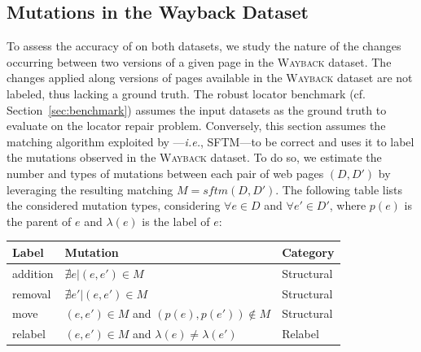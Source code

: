 \subsection{Mutations in the {\sc Wayback} Dataset}
To assess the accuracy of \erratum on both datasets, we study the nature of the changes occurring between two versions of a given page in the \textsc{Wayback} dataset.
The changes applied along versions of pages available in the \textsc{Wayback} dataset are not labeled, thus lacking a ground truth.
% 
The robust locator benchmark (cf. Section~\ref{sec:benchmark}) assumes the input datasets as the ground truth to evaluate \erratum on the locator repair problem.
Conversely, this section assumes the matching algorithm exploited by \erratum---\emph{i.e.}, SFTM---to be correct and uses it to label the mutations observed in the \textsc{Wayback} dataset.
% 
To do so, we estimate the number and types of mutations between each pair of web pages $(D, D')$ by leveraging the resulting matching $M = sftm(D,D')$.
The following table lists the considered mutation types, considering $\forall e \in D$ and $\forall e' \in D'$, where $p(e)$ is the parent of $e$ and $\lambda(e)$ is the label of $e$:
\begin{table}[h]
\centering
\begin{tabular}{|l|l|l|}
\hline
Label        & Mutation                                          & Category \\ \hline
\hline
\sf addition & $\nexists e | (e, e') \in M$                      & Structural \\ \hline
\sf removal  & $\nexists e' | (e, e') \in M$                     & Structural \\ \hline
\sf move     & $(e, e') \in M$ and $(p(e), p(e')) \notin M$      & Structural \\ \hline
\sf relabel  & $(e, e') \in M$ and $\lambda(e) \neq \lambda(e')$ & Relabel \\ \hline
\end{tabular}
\end{table}


